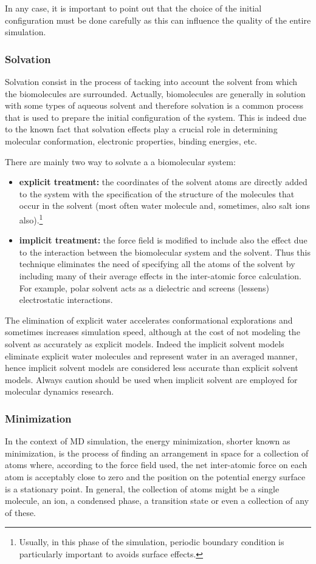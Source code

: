 In any case, it is important to point out that the choice of the initial configuration must be done carefully as this can influence the quality of the entire simulation.

\subsubsection{Solvation}
Solvation consist in the process of tacking into account the solvent from which the biomolecules are surrounded. Actually, biomolecules are generally in solution with some types of aqueous solvent and therefore solvation is a common process that is used to prepare the initial configuration of the system. This is indeed due to the known fact that solvation effects play a crucial role in determining molecular conformation, electronic properties, binding energies, etc.

There are mainly two way to solvate a a biomolecular system:
\begin{itemize}
\item \textbf{explicit treatment:} the coordinates of the solvent atoms are directly added to the system with the specification of the structure of the molecules that occur in the solvent (most often water molecule and, sometimes, also salt ions also).\footnote{Usually, in this phase of the simulation, periodic boundary condition is particularly important to avoids surface effects.} 
\item \textbf{implicit treatment:} the force field is modified to include also the effect due to the interaction between the biomolecular system and the solvent. Thus this technique eliminates the need of specifying all the atoms of the solvent by including many of their average effects in the inter-atomic force calculation. For example, polar solvent acts as a dielectric and screens (lessens) electrostatic interactions. 
\end{itemize}

The elimination of explicit water accelerates conformational explorations and sometimes increases simulation speed, although at the cost of not modeling the solvent as accurately as explicit models.
Indeed the implicit solvent models eliminate explicit water molecules and represent water in an averaged manner, hence implicit solvent models are considered less accurate than explicit solvent models. Always caution should be used when implicit solvent are employed for molecular dynamics research.

\subsubsection{Minimization}
In the context of MD simulation, the energy minimization, shorter known as minimization, is the process of finding an arrangement in space for a collection of atoms where, according to the force field used, the net inter-atomic force on each atom is acceptably close to zero and the position on the potential energy surface is a stationary point. In general, the collection of atoms might be a single molecule, an ion, a condensed phase, a transition state or even a collection of any of these. 

